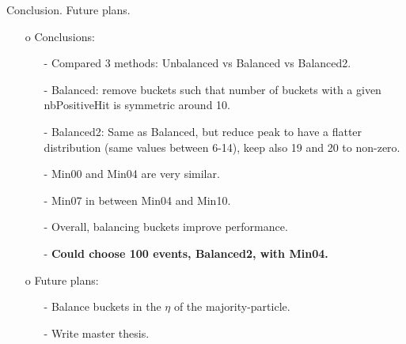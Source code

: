 \documentclass{beamer}
\begin{document}
\begin{frame}{Conclusion. Future plans.}
\begin{enumerate}
\item[o] Conclusions:
  \begin{enumerate}
\item[-] Compared 3 methods: Unbalanced vs Balanced vs Balanced2.
\item[-] Balanced: remove buckets such that number of buckets with a given nbPositiveHit is symmetric around 10.
\item[-] Balanced2: Same as Balanced, but reduce peak to have a flatter distribution (same values between 6-14), keep also 19 and 20 to non-zero.
\item[-] Min00 and Min04 are very similar.
\item[-] Min07 in between Min04 and Min10.
\item[-] Overall, balancing buckets improve performance.
\item[-]  \textbf{Could choose 100 events, Balanced2, with Min04.}
\end{enumerate}
\item[o] Future plans:
\begin{enumerate}
\item[-] Balance buckets in the $\eta$ of the majority-particle.
\item[-] Write master thesis.
\end{enumerate}
\end{enumerate}
\end{frame}
\end{document}
